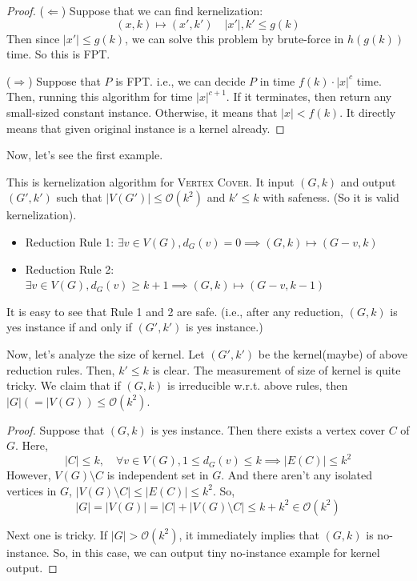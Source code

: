 \documentclass[12pt, a4paper, openany, twoside]{book}
\theoremstyle{definition}
\theoremstyle{remark}
\newcommand{\CO}{{\mathcal {O}}} \newcommand{\CP}{{\mathcal {P}}}
\theoremstyle{plain}
\numberwithin{equation}{section}
\begin{document}
\begin{proof}
    
($\Leftarrow$) Suppose that we can find kernelization: 
\[(x, k) \mapsto (x', k') \quad |x'|, k' \leq g(k)\]
Then since $|x'| \leq g(k)$, we can solve this problem by brute-force in $h(g(k))$ time. So this is FPT. 

($\Rightarrow$) Suppose that $P$ is FPT. i.e., we can decide $P$ in time $f(k) \cdot |x|^c$ time. Then, running this algorithm for time $|x|^{c+1}$. 
If it terminates, then return any small-sized constant instance. Otherwise, it means that $|x| < f(k)$. It directly means that given original instance is a kernel already. 

\end{proof}

Now, let's see the first example. 

\begin{tcolorbox}[colback=yellow!10!white,colframe=red!75!black,title=Buzz' Kernelization: $\CO(k^2)$-Vertex Kernel]

This is kernelization algorithm for \textsc{Vertex Cover}. It input $(G, k)$ and output $(G', k')$ such that 
$|V(G')| \leq \CO(k^2)$ and $k' \leq k$ with safeness. (So it is valid kernelization). 

\begin{itemize}
    \item Reduction Rule 1: $\exists v \in V(G), d_G(v) = 0 \implies (G, k) \mapsto (G - v, k)$
    \item Reduction Rule 2: $\exists v \in V(G), d_G(v) \geq k + 1 \implies (G, k) \mapsto (G-v, k-1)$
\end{itemize}

\end{tcolorbox}

It is easy to see that Rule 1 and 2 are safe. (i.e., after any reduction, $(G, k)$ is yes instance if and only if $(G', k')$ is yes instance.) 

Now, let's analyze the size of kernel. Let $(G', k')$ be the kernel(maybe) of above reduction rules. 
Then, $k' \leq k$ is clear. The measurement of size of kernel is quite tricky. We claim that if $(G, k)$ is irreducible w.r.t. above rules, then $|G|(= |V(G)) \leq \CO(k^2)$. 
\begin{proof}

Suppose that $(G, k)$ is yes instance. Then there exists a vertex cover $C$ of $G$. Here, 
\[|C| \leq k ,\quad \forall v \in V(G), 1 \leq d_G(v) \leq k \implies |E(C)| \leq k^2\]
However, $V(G) \setminus C$ is independent set in $G$. And there aren't any isolated vertices in $G$, 
$|V(G) \setminus C| \leq |E(C)| \leq k^2$. So, 
\[|G| = |V(G)| = |C| + |V(G) \setminus C| \leq k + k^2 \in \CO(k^2)\]

Next one is tricky. If $|G| > \CO(k^2)$, it immediately implies that $(G, k)$ is no-instance. So, in this case, we can 
output tiny no-instance example for kernel output. 

\end{proof}
\end{document}
